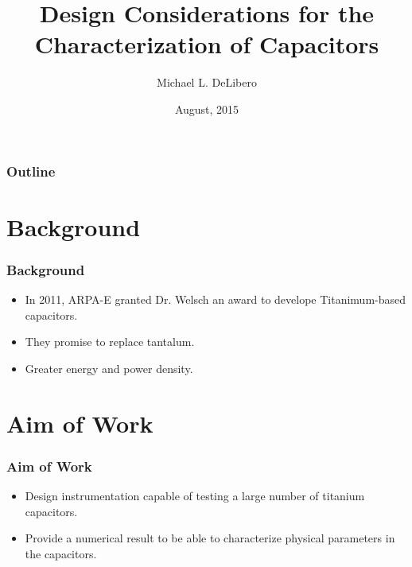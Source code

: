 \documentclass{beamer}
\title{Design Considerations for the Characterization of Capacitors}
\author{Michael L. DeLibero}
\date{August, 2015}
\institute[CWRU]{Case Western Reserve University}
\begin{document}
\begin{frame}
    \titlepage
\end{frame}



\begin{frame}
  \frametitle{Outline}
  \tableofcontents
\end{frame}

\section{Background}
\begin{frame}
    \frametitle{Background}
    \begin{itemize}
        \item In 2011, ARPA-E granted Dr. Welsch an award to develope Titanimum-based capacitors.
        \item They promise to replace tantalum.
        \item Greater energy and power density.
    \end{itemize}
\end{frame}

\section{Aim of Work}
\begin{frame}
    \frametitle{Aim of Work}
    \begin{itemize}
        \item Design instrumentation capable of testing a large number of titanium capacitors.
        \item Provide a numerical result to be able to characterize physical parameters in the capacitors.
    \end{itemize}
\end{frame}








\end{document}
